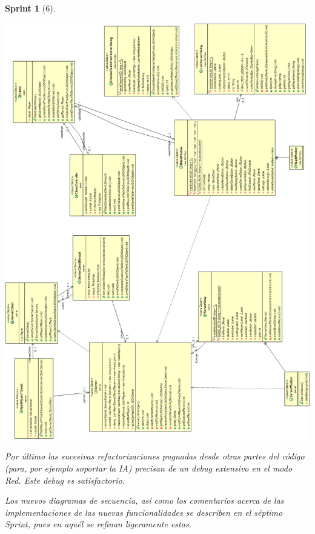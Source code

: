 \documentclass[12pt,a4paper,openright]{book}
\theoremstyle{break}
\newtheorem*{sprint}{Sprint}
\begin{document}
\begin{sprint}[6]
\begin{itemize}
\begin{center}
\includegraphics[scale=0.45]{UMLClasesRedSprint6.png} 
\end{center}

\end{itemize}

Por último las sucesivas refactorizaciones pugnadas desde otras partes del código (para, por ejemplo soportar la IA) precisan de un debug extensivo en el modo Red. Este debug es satisfactorio.

Los nuevos diagramas de secuencia, así como los comentarios acerca de las implementaciones de las nuevas funcionalidades se describen en el séptimo Sprint, pues en aquél se refinan ligeramente estas.

\end{sprint}
\end{document}
